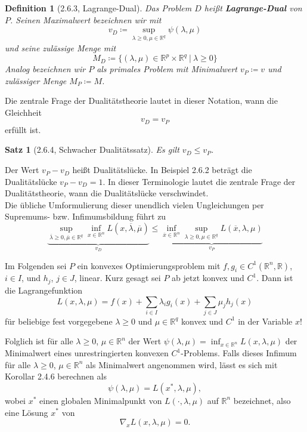 \documentclass[12pt]{extreport} %
\newcommand{\R}{\mathbb{R}}
\theoremstyle{named}
\theoremstyle{nnamed}
\theoremstyle{itshape}
\newtheorem*{satz}{Satz}
\newtheorem*{definition}{Definition}
\theoremstyle{normal}
\begin{document}
\begin{definition}[2.6.3, Lagrange-Dual]
	Das Problem $D$ heißt \textbf{Lagrange-Dual} von $P$. Seinen Maximalwert bezeichnen wir mit
	$$ v_D \coloneqq \sup_{\lambda \geq 0, \mu \in \R^q} \psi(\lambda, \mu) $$
	und seine zulässige Menge mit
	$$ M_D \coloneqq \{ (\lambda, \mu) \in \R^p \times \R^q ~|~\lambda \geq 0 \} $$
	Analog bezeichnen wir $P$ als primales Problem mit Minimalwert $v_P \coloneqq v$ und zulässiger Menge $M_P \coloneqq M$.
\end{definition}	

Die zentrale Frage der Dualitätstheorie lautet in dieser Notation, wann die Gleichheit
	$$ v_D = v_P $$
erfüllt ist.

\begin{satz}[2.6.4, Schwacher Dualitätssatz]
	Es gilt $v_D \leq v_P$.	
\end{satz}
	
Der Wert $v_P - v_D$ heißt Dualitätslücke. In Beispiel 2.6.2 beträgt die Dualitätslücke $v_P - v_D = 1$. In dieser Terminologie lautet die zentrale Frage der Dualitätstheorie, wann die Dualitätslücke verschwindet.	 ~\\

Die übliche Umformulierung dieser unendlich vielen Ungleichungen per Supremums- bzw. Infimumsbildung führt zu
	$$ \underbrace{\sup_{\overline{\lambda} \geq 0, \overline{\mu} \in \R^q} \inf_{x \in \R^n} L(x, \overline{\lambda}, \overline{\mu})}_{v_D} \leq \underbrace{\inf_{\overline{x} \in \R^n} \sup_{\lambda \geq 0, \mu \in \R^q} L(\overline{x}, \lambda, \mu)}_{v_P} $$
	
Im Folgenden sei $P$ ein konvexes Optimierungsproblem mit $f, g_i \in C^1(\R^n, \R)$, $i \in I$, und $h_j$, $j \in J$, linear. Kurz gesagt sei $P$ ab jetzt konvex und $C^1$. Dann ist die Lagrangefunktion
	$$ L(x, \lambda, \mu) = f(x) + \sum_{i \in I} \lambda_i g_i(x) + \sum_{j \in J} \mu_j h_j(x) $$
für beliebige fest vorgegebene $\lambda \geq 0$ und $\mu \in \R^q$ konvex und $C^1$ in der Variable $x$! \smallskip

Folglich ist für alle $\lambda \geq 0$, $\mu \in \R^n$ der Wert $\psi(\lambda, \mu) = \inf_{x \in \R^n} L(x, \lambda, \mu)$ der Minimalwert eines unrestringierten konvexen $C^1$-Problems. Falls dieses Infimum für alle $\lambda \geq 0$, $\mu \in \R^n$ als Minimalwert angenommen wird, lässt es sich mit Korollar 2.4.6 berechnen als
	$$ \psi(\lambda, \mu) = L(x^*, \lambda, \mu), $$
wobei $x^*$ einen globalen Minimalpunkt von $L(\cdot, \lambda, \mu)$ auf $\R^n$ bezeichnet, also eine Lösung $x^*$ von
$$ \nabla_x L(x, \lambda, \mu) = 0. $$
\end{document}
